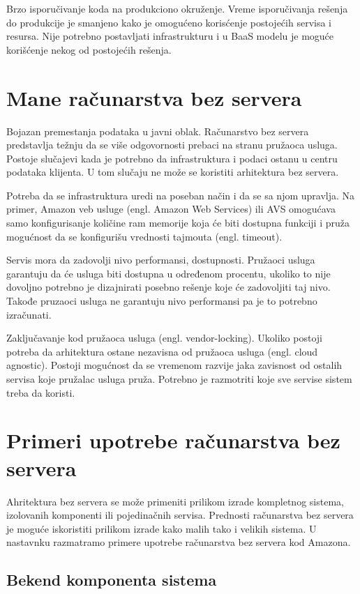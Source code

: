 \documentclass[12pt,oneside]{memoir}
\begin{document}
Brzo isporučivanje koda na produkciono okruženje. Vreme isporučivanja rešenja do produkcije je smanjeno kako je omogućeno korisćenje postojećih servisa i resursa. Nije potrebno postavljati infrastrukturu i u BaaS modelu je moguće korišćenje nekog od postojećih rešenja.

\section{Mane računarstva bez servera}

Bojazan premestanja podataka u javni oblak. Računarstvo bez servera predstavlja težnju da se više odgovornosti prebaci na stranu pružaoca usluga. Postoje slučajevi kada je potrebno da infrastruktura i podaci ostanu u centru podataka klijenta. U tom slučaju ne može se koristiti arhitektura bez servera\cite{sa}.

Potreba da se infrastruktura uredi na poseban način i da se sa njom upravlja. Na primer, Amazon veb usluge (engl. Amazon Web Services) ili AVS omogućava samo konfigurisanje količine ram memorije koja će biti dostupna funkciji i pruža mogućnost da se konfigurišu vrednosti tajmouta (engl. timeout).

Servis mora da zadovolji nivo performansi, dostupnosti. Pružaoci usluga garantuju da će usluga biti dostupna u određenom procentu, ukoliko to nije dovoljno potrebno je dizajnirati posebno rešenje koje će zadovoljiti taj nivo. Takođe pruzaoci usluga ne garantuju nivo performansi pa je to potrebno izračunati\cite{sa}.

Zaključavanje kod pružaoca usluga (engl. vendor-locking). Ukoliko postoji potreba da arhitektura ostane nezavisna od pružaoca usluga (engl. cloud agnostic). Postoji mogućnost da se vremenom razvije jaka zavisnost od ostalih servisa koje pružalac usluga pruža. Potrebno je razmotriti koje sve servise sistem treba da koristi.
 

\section{Primeri upotrebe računarstva bez servera}

Ahritektura bez servera se može primeniti prilikom izrade kompletnog sistema, izolovanih komponenti ili pojedinačnih servisa. Prednosti računarstva bez servera je moguće iskoristiti prilikom izrade kako malih tako i velikih sistema\cite{sa}. U nastavnku razmatramo primere upotrebe računarstva bez servera kod Amazona.

\subsection{Bekend komponenta sistema}
\end{document}
